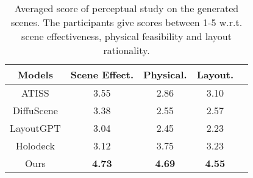 \begin{table}[]
\centering
\setlength{\tabcolsep}{7pt}
\begin{tabular}{ccccc}
\hline
Models     &  Scene Effect. & Physical. & Layout. \\
\hline
ATISS      & 3.55           & 2.86              & 3.10       \\
\hline
DiffuScene & 3.38           & 2.55              & 2.57      \\
\hline
LayoutGPT  & 3.04          & 2.45           & 2.23       \\
\hline
Holodeck   & 3.12          & 3.75             & 3.23       \\
\hline
Ours       & \textbf{4.73}          & \textbf{4.69}            & \textbf{4.55}  \\
\hline
\end{tabular}
\caption{Averaged score of perceptual study on the generated scenes. The participants give scores between 1-5 w.r.t. scene effectiveness, physical feasibility and layout rationality.}
\label{tab:perceptual_study}
\end{table}